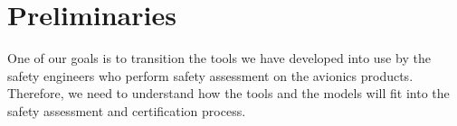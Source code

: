 \section{Preliminaries}
\label{sec:prelims}
One of our goals is to transition the tools we have developed into use by the safety engineers who perform safety assessment on the avionics products. Therefore, we need to understand how the tools and the models will fit into the safety assessment and certification process.






